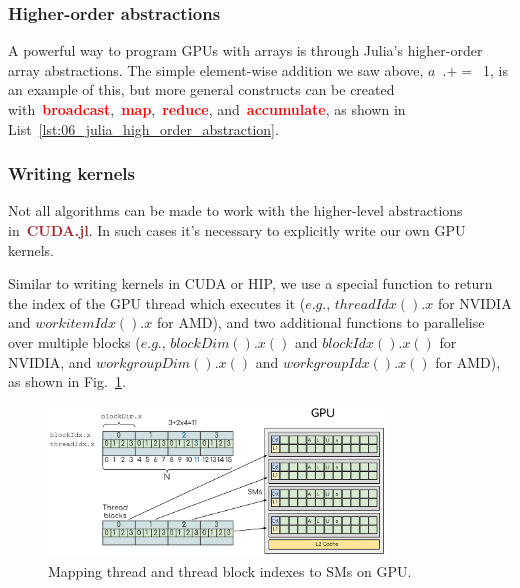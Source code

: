 \subsubsection{Higher-order abstractions}


\par
A powerful way to program GPUs with arrays is through Julia’s higher-order array abstractions.
The simple element-wise addition we saw above, $a$~$.+=$~1, is an example of this, but more general constructs can be created with~\textbf{\textcolor{red}{broadcast}},~\textbf{\textcolor{red}{map}},~\textbf{\textcolor{red}{reduce}}, and~\textbf{\textcolor{red}{accumulate}}, as shown in List~\ref{lst:06_julia_high_order_abstraction}.





\subsubsection{Writing kernels}


\par
Not all algorithms can be made to work with the higher-level abstractions in~\textbf{\textcolor{brown}{CUDA.jl}}.
In such cases it’s necessary to explicitly write our own GPU kernels.


\par
Similar to writing kernels in CUDA or HIP, we use a special function to return the index of the GPU thread which executes it ($e.g.$, $threadIdx().x$ for NVIDIA and $workitemIdx().x$ for AMD), and two additional functions to parallelise over multiple blocks ($e.g.$, $blockDim().x()$ and $blockIdx().x()$ for NVIDIA, and $workgroupDim().x()$ and $workgroupIdx().x()$ for AMD), as shown in Fig.~\ref{fig:mapping_blocks_2_SMs}.


\begin{figure}[!h]
\centering\includegraphics[width=0.8\textwidth]{fig_hardware/mapping_blocks_2_SMs.png}
\caption{Mapping thread and thread block indexes to SMs on GPU.}\label{fig:mapping_blocks_2_SMs}
\end{figure}


